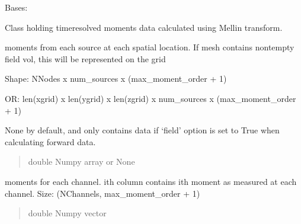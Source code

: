 \documentclass[letterpaper,10pt,english]{sphinxmanual}
\begin{document}
\begin{fulllineitems}
\label{\detokenize{_autosummary/nirfasterff.base.data.TRMomentsdata:nirfasterff.base.data.TRMomentsdata}}
\pysigstartsignatures
{}
\pysigstopsignatures
\sphinxAtStartPar
Bases: 

\sphinxAtStartPar
Class holding time\sphinxhyphen{}resolved moments data calculated using Mellin transform.

\begin{fulllineitems}
\label{\detokenize{_autosummary/nirfasterff.base.data.TRMomentsdata:nirfasterff.base.data.TRMomentsdata.phi}}
\pysigstartsignatures
{}
\pysigstopsignatures
\sphinxAtStartPar
moments from each source at each spatial location. If mesh contains non\sphinxhyphen{}tempty field vol, this will be represented on the grid

\sphinxAtStartPar
Shape: NNodes x num\_sources x (max\_moment\_order + 1)

\sphinxAtStartPar
OR: len(xgrid) x len(ygrid) x len(zgrid) x num\_sources x (max\_moment\_order + 1)

\sphinxAtStartPar
None by default, and only contains data if ‘field’ option is set to True when calculating forward data.
\begin{quote}\begin{description}
\sphinxAtStartPar
double Numpy array or None

\end{description}\end{quote}

\end{fulllineitems}


\begin{fulllineitems}
\label{\detokenize{_autosummary/nirfasterff.base.data.TRMomentsdata:nirfasterff.base.data.TRMomentsdata.moments}}
\pysigstartsignatures
{}
\pysigstopsignatures
\sphinxAtStartPar
moments for each channel. i\sphinxhyphen{}th column contains i\sphinxhyphen{}th moment as measured at each channel. Size: (NChannels, max\_moment\_order + 1)
\begin{quote}\begin{description}
\sphinxAtStartPar
double Numpy vector


\end{description}
\end{quote}
\end{fulllineitems}
\end{fulllineitems}
\end{document}
